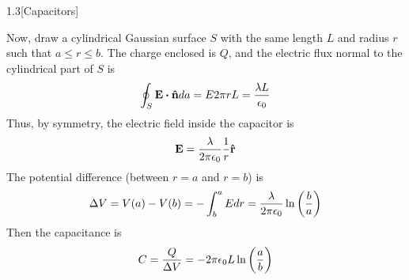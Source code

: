 \documentclass[12pt]{article}
\begin{document}
\begin{problem}{1.3}[Capacitors]
\begin{solution}
    Now, draw a cylindrical Gaussian surface $S$ with the same length $L$ and 
    radius $r$ such that $a\leq r\leq b$. The charge enclosed is $Q$, and the 
    electric flux normal to the cylindrical part of $S$ is
    \begin{equation}
        \oint_S\vb{E}\vdot\nhat da=E2\pi rL=\frac{\lambda L}{\epsilon_0}
    \end{equation}
    Thus, by symmetry, the electric field inside the capacitor is
    \begin{equation}
        \vb{E}=\frac{\lambda}{2\pi\epsilon_0}\frac1r\vb{\hat{r}} 
    \end{equation}
    The potential difference (between $r=a$ and $r=b$) is
    \begin{equation}
        \Delta V=V(a)-V(b)=-\int_b^aEdr=\frac{\lambda}{2\pi\epsilon_0}
            \ln\qty(\frac{b}{a})
    \end{equation}
    Then the capacitance is
    \begin{equation}
        C=\frac{Q}{\Delta V}=-2\pi\epsilon_0L\ln\qty(\frac{a}{b})
    \end{equation}

\end{solution}
    
\end{problem}
\end{document}
